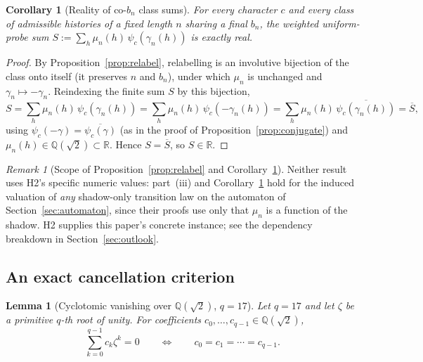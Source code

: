 \documentclass[11pt,a4paper]{article}
\newtheorem{lemma}[theorem]{Lemma}
\newtheorem{corollary}[theorem]{Corollary}
\theoremstyle{definition}
\theoremstyle{remark}
\newtheorem{remark}[theorem]{Remark}
\newcommand{\Q}{\mathbb{Q}}
\newcommand{\R}{\mathbb{R}}
\newcommand{\Qroot}{\Q(\sqrt{2})}
\begin{document}
\begin{corollary}[Reality of co-$b_n$ class sums]
  \label{cor:real}
  For every character $c$ and every class of admissible histories of a fixed length
  $n$ sharing a final $b_n$, the weighted uniform-probe sum
  $S := \sum_h \mu_n(h)\,\psi_c(\gamma_n(h))$ is exactly real.
\end{corollary}

\begin{proof}
  By Proposition~\ref{prop:relabel}, relabelling is an involutive bijection of the
  class onto itself (it preserves $n$ and $b_n$), under which $\mu_n$ is unchanged and
  $\gamma_n \mapsto -\gamma_n$. Reindexing the finite sum $S$ by this bijection,
  \begin{equation*}
    S = \sum_h \mu_n(h)\,\psi_c(\gamma_n(h))
    = \sum_h \mu_n(h)\,\psi_c(-\gamma_n(h))
    = \sum_h \mu_n(h)\,\overline{\psi_c(\gamma_n(h))}
    = \overline{S},
  \end{equation*}
  using $\psi_c(-\gamma)=\overline{\psi_c(\gamma)}$ (as in the proof of
  Proposition~\ref{prop:conjugate}) and $\mu_n(h)\in\Qroot\subset\R$. Hence $S=\overline
  S$, so $S\in\R$.
\end{proof}

\begin{remark}[Scope of Proposition~\ref{prop:relabel} and Corollary~\ref{cor:real}]
  \label{rem:relabel-scope}
  Neither result uses \textup{H2}'s specific numeric values: part~(iii) and
  Corollary~\ref{cor:real} hold for the induced valuation of \emph{any} shadow-only
  transition law on the automaton of Section~\ref{sec:automaton}, since their proofs use
  only that $\mu_n$ is a function of the shadow. \textup{H2} supplies this paper's
  concrete instance; see the dependency breakdown in Section~\ref{sec:outlook}.
\end{remark}

\subsection{An exact cancellation criterion}

\begin{lemma}[Cyclotomic vanishing over $\Qroot$, $q=17$]
  \label{lem:cyclotomic}
  Let $q=17$ and let $\zeta$ be a primitive $q$-th root of unity. For coefficients
  $c_0,\dots,c_{q-1} \in \Qroot$,
  \begin{equation}
    \label{eq:cyclotomic}
    \sum_{k=0}^{q-1} c_k \zeta^k = 0
    \qquad \Longleftrightarrow \qquad
    c_0=c_1=\cdots=c_{q-1}.
  \end{equation}
\end{lemma}
\end{document}
